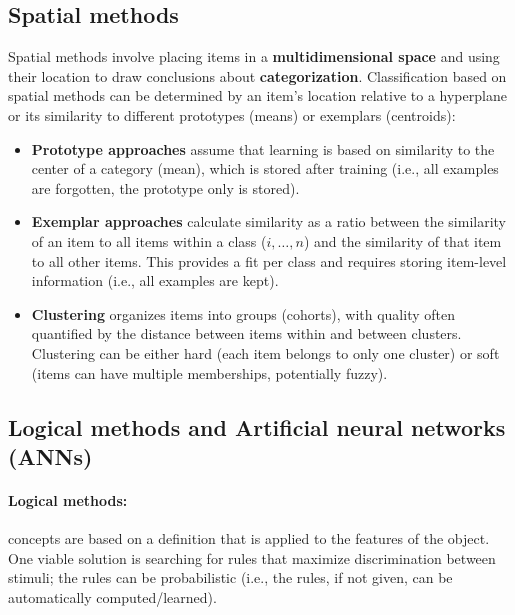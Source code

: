 \subsection{Spatial methods}
Spatial methods involve placing items in a \textbf{multidimensional space} and using their location to draw conclusions about \textbf{categorization}.
Classification based on spatial methods can be determined by an item's location relative to a hyperplane or its similarity to different prototypes (means) or exemplars (centroids):
\begin{itemize}
    \item \textbf{Prototype approaches} assume that learning is based on similarity to the center of a category (mean), which is stored after training (i.e., all examples are forgotten, the prototype only is stored).
    \item \textbf{Exemplar approaches} calculate similarity as a ratio between the similarity of an item to all items within a class ($i, \dots , n$) and the similarity of that item to all other items. This provides a fit per class and requires storing item-level information (i.e., all examples are kept).
    \item \textbf{Clustering} organizes items into groups (cohorts), with quality often quantified by the distance between items within and between clusters. Clustering can be either hard (each item belongs to only one cluster) or soft (items can have multiple memberships, potentially fuzzy).
\end{itemize}


\subsection{Logical methods and Artificial neural networks (ANNs)}
\paragraph{Logical methods:} concepts are based on a definition that is applied to the features of the object. One viable solution is searching for rules that maximize discrimination between stimuli; the rules can be probabilistic (i.e., the rules, if not given, can be automatically computed/learned).

